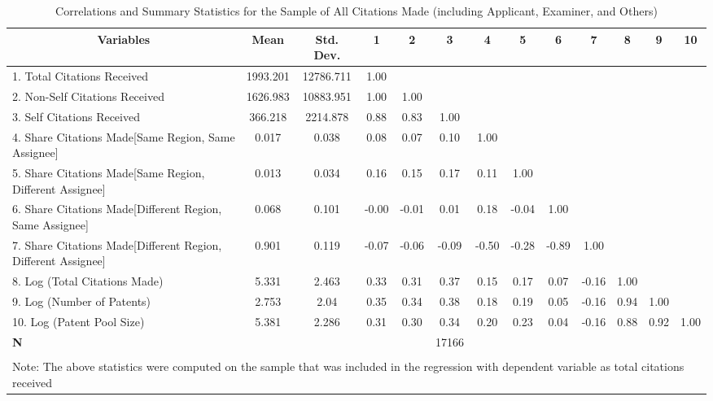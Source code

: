 \begin{sidewaystable}[htbp]\centering \caption{Correlations and Summary Statistics for the Sample of All Citations Made (including Applicant, Examiner, and Others)\label{a.e.o.t.n.tcorrelation}}
\footnotesize
\onehalfspacing
\begin{tabular}{l  c  c  c  c  c  c  c  c  c  c  c  c }\hline\hline
\multicolumn{1}{c}{Variables} & \textbf{Mean}& \textbf{Std. Dev.}&1&2&3&4&5&6&7&8&9&10\\ \hline
1. Total Citations Received& 1993.201 & 12786.711&1.00\\
2. Non-Self Citations Received& 1626.983 & 10883.951&1.00&1.00\\
3. Self Citations Received& 366.218 & 2214.878&0.88&0.83&1.00\\
4. Share Citations Made[Same Region, Same Assignee]& 0.017 & 0.038&0.08&0.07&0.10&1.00\\
5. Share Citations Made[Same Region, Different Assignee]& 0.013 & 0.034&0.16&0.15&0.17&0.11&1.00\\
6. Share Citations Made[Different Region, Same Assignee]& 0.068 & 0.101&-0.00&-0.01&0.01&0.18&-0.04&1.00\\
7. Share Citations Made[Different Region, Different Assignee]& 0.901 & 0.119&-0.07&-0.06&-0.09&-0.50&-0.28&-0.89&1.00\\
8. Log (Total Citations Made) & 5.331 & 2.463&0.33&0.31&0.37&0.15&0.17&0.07&-0.16&1.00\\
9. Log (Number of Patents)& 2.753 & 2.04&0.35&0.34&0.38&0.18&0.19&0.05&-0.16&0.94&1.00\\
10. Log (Patent Pool Size)& 5.381 & 2.286&0.31&0.30&0.34&0.20&0.23&0.04&-0.16&0.88&0.92&1.00\\
\hline
\textbf{N}&&&&&17166\\
\hline \hline \\
\multicolumn{13}{l}{\footnotesize Note: The above statistics were computed on the sample that was included in the regression with dependent variable as total citations received}\\
 \end{tabular}
\end{sidewaystable}
